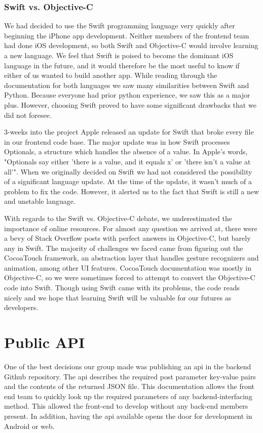 \documentclass[12pt]{article}
\begin{document}
\subsubsection{Swift vs. Objective-C}
We had decided to use the Swift programming language very quickly after beginning the iPhone app development.
Neither members of the frontend team had done iOS development, so both Swift and Objective-C would involve learning a new language. 
We feel that Swift is poised to become the dominant iOS language in the future, and it would therefore be the most useful to know if either of us wanted to build another app. 
While reading through the documentation for both languages we saw many similarities between Swift and Python. 
Because everyone had prior python experience, we saw this as a major plus. 
However, choosing Swift proved to have some significant drawbacks that we did not foresee. 

\bigskip

3-weeks into the project Apple released an update for Swift that broke every file in our frontend code base. 
The major update was in how Swift processes Optionals, a structure which handles the absence of a value. 
In Apple's words, "Optionals say either 'there is a value, and it equals x' or 'there isn't a value at all'". 
When we originally decided on Swift we had not considered the possibility of a significant language update. 
At the time of the update, it wasn't much of a problem to fix the code. 
However, it alerted us to the fact that Swift is still a new and unstable language. 

\bigskip

With regards to the Swift vs. Objective-C debate, we underestimated the importance of online resources. 
For almost any question we arrived at, there were a bevy of Stack Overflow posts with perfect answers in Objective-C, but barely any in Swift. 
The majority of challenges we faced came from figuring out the CocoaTouch framework, an abstraction layer that handles gesture recognizers and animation, among other UI features. 
CocoaTouch documentation was mostly in Objective-C, so we were sometimes forced to attempt to convert the Objective-C code into Swift. 
Though using Swift came with its problems, the code reads nicely and we hope that learning Swift will be valuable for our futures as developers.

\bigskip

\section{Public API}
One of the best decisions our group made was publishing an api in the backend Github repository. 
The api describes the required post parameter key-value pairs and the contents of the returned JSON file. 
This documentation allows the front end team to quickly look up the required parameters of any backend-interfacing method. 
This allowed the front-end to develop without any back-end members present.
In addition, having the api available opens the door for development in Android or web.
\end{document}
